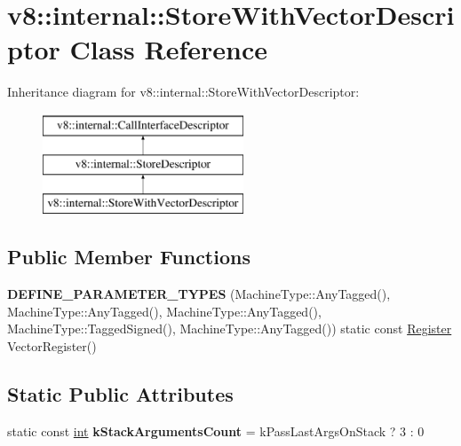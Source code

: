 \hypertarget{classv8_1_1internal_1_1StoreWithVectorDescriptor}{}\section{v8\+:\+:internal\+:\+:Store\+With\+Vector\+Descriptor Class Reference}
\label{classv8_1_1internal_1_1StoreWithVectorDescriptor}
Inheritance diagram for v8\+:\+:internal\+:\+:Store\+With\+Vector\+Descriptor\+:\begin{figure}[H]
\begin{center}
\leavevmode
\includegraphics[height=3.000000cm]{classv8_1_1internal_1_1StoreWithVectorDescriptor}
\end{center}
\end{figure}
\subsection*{Public Member Functions}
\begin{DoxyCompactItemize}
\item 
\mbox{\label{classv8_1_1internal_1_1StoreWithVectorDescriptor_aa1a6aacfc10a15ac22ae9c33c09992ed}} 
{\bfseries D\+E\+F\+I\+N\+E\+\_\+\+P\+A\+R\+A\+M\+E\+T\+E\+R\+\_\+\+T\+Y\+P\+ES} (Machine\+Type\+::\+Any\+Tagged(), Machine\+Type\+::\+Any\+Tagged(), Machine\+Type\+::\+Any\+Tagged(), Machine\+Type\+::\+Tagged\+Signed(), Machine\+Type\+::\+Any\+Tagged()) static const \mbox{\hyperlink{classv8_1_1internal_1_1Register}{Register}} Vector\+Register()
\end{DoxyCompactItemize}
\subsection*{Static Public Attributes}
\begin{DoxyCompactItemize}
\item 
\mbox{\label{classv8_1_1internal_1_1StoreWithVectorDescriptor_a9c5de06beb9c37eea0218fd7af452ec0}} 
static const \mbox{\hyperlink{classint}{int}} {\bfseries k\+Stack\+Arguments\+Count} = k\+Pass\+Last\+Args\+On\+Stack ? 3 \+: 0
\end{DoxyCompactItemize}
